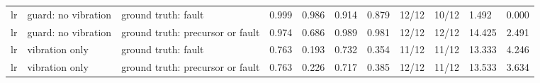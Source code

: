 \begin{tabular}{lllllllllll}
lr & guard: no vibration & ground truth: fault & 0.999 & 0.986 & 0.914 & 0.879 & 12/12 & 10/12 & 1.492 & 0.000 \\
lr & guard: no vibration & ground truth: precursor or fault & 0.974 & 0.686 & 0.989 & 0.981 & 12/12 & 12/12 & 14.425 & 2.491 \\
lr & vibration only & ground truth: fault & 0.763 & 0.193 & 0.732 & 0.354 & 11/12 & 11/12 & 13.333 & 4.246 \\
lr & vibration only & ground truth: precursor or fault & 0.763 & 0.226 & 0.717 & 0.385 & 12/12 & 11/12 & 13.533 & 3.634 \\
\bottomrule
\end{tabular}
